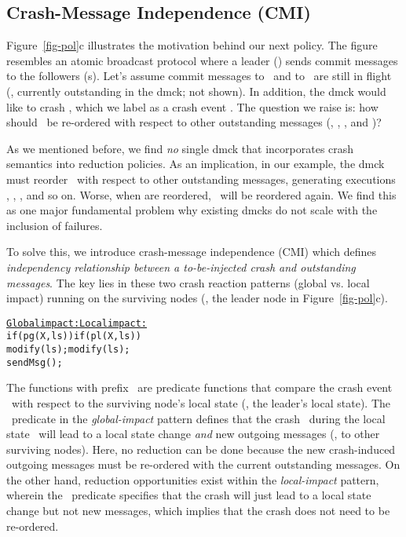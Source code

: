 

\subsection{Crash-Message Independence (CMI)}
\label{sam-cmi}


Figure~\ref{fig-pol}c illustrates the motivation behind our next
policy.  The figure resembles an atomic broadcast protocol where a
leader () sends commit messages to the followers (s).
Let's assume commit messages  to \fone\ and  to \ftwo\
are still in flight (\ie, currently outstanding in the dmck; not
shown).  In addition, the dmck would like to crash \ftri, which we
label as a crash event \xx.  The question we raise is: how should \xx\
be re-ordered with respect to other outstanding messages
(\ma, \mb, \mc, and \md)?


As we mentioned before, we find {\em no} single dmck that incorporates
crash semantics into reduction policies.  As an implication, in our
example, the dmck must reorder \xx\ with respect to other outstanding
messages, generating executions \ts{Xabcd}, \ts{aXbcd}, \ts{abXcd},
and so on.  Worse, when \ts{abcd} are reordered, \xx\ will be
reordered again.  We find this as one major fundamental problem why
existing dmcks do not scale with the inclusion of failures.

To solve this, we introduce crash-message independence (CMI) which
defines {\em independency relationship between a to-be-injected crash
and outstanding messages}.  The key lies in these two crash reaction
patterns (global vs. local impact) running on the surviving nodes
(\eg, the leader node in Figure~\ref{fig-pol}c).


{\small
\begin{alltt}
      \underline{Global impact:}       \underline{Local impact:}
      if (pg(X,ls))         if (pl(X,ls)) 
        modify(ls);           modify(ls);
        sendMsg();           
\end{alltt}
}


The functions with prefix \pp\ are predicate functions that compare
the crash event \xx\ with respect to the surviving node's local state
(\eg, the leader's local state).  The \pg\ predicate in the {\em
global-impact} pattern defines that the crash \xx\ during the local
state \ls\ will lead to a local state change {\em and} new outgoing
messages (\eg, to other surviving nodes).  Here, no reduction can be
done because the new crash-induced outgoing messages must be
re-ordered with the current outstanding messages.  On the other hand,
reduction opportunities exist within the {\em local-impact} pattern,
wherein the \pl\ predicate specifies that the crash will just lead to
a local state change but not new messages, which implies that the
crash does not need to be re-ordered.  


